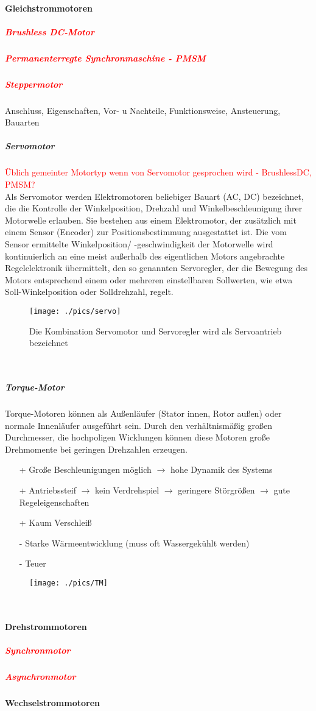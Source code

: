 				\paragraph{Gleichstrommotoren} 
					\subparagraph{\textcolor{red}{Brushless DC-Motor}}
					\subparagraph{\textcolor{red}{Permanenterregte Synchronmaschine - PMSM}} 
					\subparagraph{\textcolor{red}{Steppermotor}}
					Anschluss, Eigenschaften, Vor- u Nachteile, Funktionsweise, Ansteuerung, Bauarten
					\subparagraph{Servomotor} 
					\textcolor{red}{Üblich gemeinter Motortyp wenn von Servomotor gesprochen wird - BrushlessDC, PMSM?}\\
					Als Servomotor werden Elektromotoren beliebiger Bauart (AC, DC) bezeichnet, die die Kontrolle der Winkelposition, Drehzahl und Winkelbeschleunigung ihrer Motorwelle erlauben. Sie bestehen aus einem Elektromotor, der zusätzlich mit einem Sensor (Encoder) zur Positionsbestimmung ausgestattet ist. Die vom Sensor ermittelte Winkelposition/ -geschwindigkeit der Motorwelle wird kontinuierlich an eine meist außerhalb des eigentlichen Motors angebrachte Regelelektronik übermittelt, den so genannten Servoregler, der die Bewegung des Motors entsprechend einem oder mehreren einstellbaren Sollwerten, wie etwa Soll-Winkelposition oder Solldrehzahl, regelt.
					\begin{figure}[h]
						\centering
						\texttt{[image: ./pics/servo]}
						\caption{Die Kombination Servomotor und Servoregler wird als Servoantrieb bezeichnet}
	
					\end{figure}
					\leavevmode \\
					\subparagraph{Torque-Motor} 
					Torque-Motoren können als Außenläufer (Stator innen, Rotor außen) oder normale Innenläufer ausgeführt sein. Durch den verhältnismäßig großen Durchmesser, die hochpoligen Wicklungen können diese Motoren große Drehmomente bei geringen Drehzahlen erzeugen.
					\begin{itemize}
						\item[+] Große Beschleunigungen möglich $ \rightarrow $ hohe Dynamik des Systems
						\item[+] Antriebssteif $ \rightarrow $ kein Verdrehspiel $ \rightarrow $ geringere Störgrößen $ \rightarrow $ gute Regeleigenschaften
						\item[+] Kaum Verschleiß
						\item[-] Starke Wärmeentwicklung (muss oft Wassergekühlt werden)
						\item[-] Teuer
					\end{itemize}
					\begin{figure}[h]
						\centering
						\texttt{[image: ./pics/TM]}
	
					\end{figure}
					\leavevmode \\
				\paragraph{Drehstrommotoren} 
					\subparagraph{\textcolor{red}{Synchronmotor}}
					\subparagraph{\textcolor{red}{Asynchronmotor}}
				\paragraph{Wechselstrommotoren} 